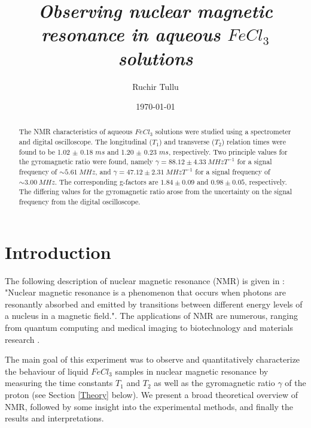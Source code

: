 \documentclass[a4paper, 12pt]{article}  %
\begin{document}
\title{\textit{Observing nuclear magnetic resonance in aqueous $FeCl_3$ solutions}}
\author{Ruchir Tullu }%
\date{\today}

\maketitle

\begin{abstract}
    The NMR characteristics of aqueous $FeCl_3$ solutions were studied using a spectrometer and digital oscilloscope. The longitudinal ($T_1$) and transverse ($T_2$) relation times were found to be 1.02 $\pm$ 0.18 $ms$ and 1.20 $\pm$ 0.23 $ms$, respectively. Two principle values for the gyromagnetic ratio were found, namely $\gamma = 88.12 \pm 4.33 \ MHzT^{-1}$ for a signal frequency of $\sim 5.61 \ MHz$, and $\gamma = 47.12 \pm 2.31 \ MHzT^{-1}$ for a signal frequency of $\sim 3.00 \ MHz$. The corresponding g-factors are $1.84 \pm 0.09$ and $0.98 \pm 0.05$, respectively. The differing values for the gyromagnetic ratio arose from the uncertainty on the signal frequency from the digital oscilloscope.
\end{abstract}


\section{Introduction}
The following description of nuclear magnetic resonance (NMR) is given in \cite{Lab Manual}:
"Nuclear magnetic resonance is a phenomenon that occurs when photons are resonantly absorbed and emitted by transitions between different energy levels of a nucleus in a magnetic field.". The applications of NMR are numerous, ranging from quantum computing \cite{NMR Quantum Computers-Jones2011, NMR QC-Warren} and medical imaging \cite{ACS NMR} to biotechnology and materials research \cite{Benchtop NMR}.
\newline

The main goal of this experiment was to observe and quantitatively characterize the behaviour of liquid $FeCl_3$ samples in nuclear magnetic resonance by measuring the time constants $T_1$ and $T_2$ as well as the gyromagnetic ratio $\gamma$ of the proton (see Section \ref{Theory} below). We present a broad theoretical overview of NMR, followed by some insight into the experimental methods, and finally the results and interpretations.
\end{document}
